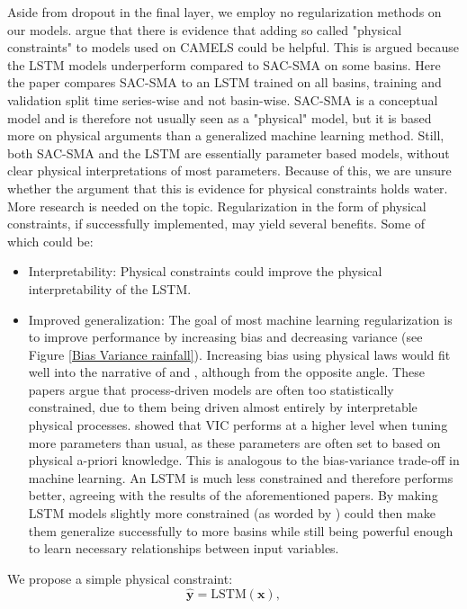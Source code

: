 Aside from dropout in the final layer, we employ no regularization methods on 
our models. \citet{lstm_third_paper} 
argue that there is evidence that adding so called "physical constraints" to 
models used on CAMELS could be helpful. This is argued because the LSTM models 
underperform compared to SAC-SMA on some basins. Here the paper compares SAC-SMA 
to an LSTM trained on all basins, training and validation split time series-wise 
and not basin-wise. SAC-SMA is a conceptual model and is therefore not usually seen 
as a "physical" model, but it is based more on physical arguments than a 
generalized machine learning method. Still, both SAC-SMA and the LSTM are essentially 
parameter based models, without clear physical interpretations of most parameters. 
Because of this, we are unsure whether the argument that this is evidence for physical 
constraints holds water. More research is needed on the topic. Regularization in 
the form of physical constraints, if successfully implemented, may yield several 
benefits. Some of which could be:
\begin{itemize}
\item Interpretability: Physical constraints could improve the physical interpretability 
of the LSTM.
\item Improved generalization: The goal of most machine learning regularization is 
to improve performance by increasing bias and decreasing variance (see Figure 
\ref{Bias Variance rainfall}). Increasing bias using physical laws would fit well 
into the narrative of \citet{BiasVarianceVIC} and \citet{VICbench}, although from 
the opposite angle. These papers argue that process-driven models are often too 
statistically constrained, due to them being driven almost entirely by interpretable 
physical processes. \citet{VICbench} showed that VIC performs at a higher level 
when tuning more parameters than usual, as these parameters are often set to based 
on physical a-priori knowledge. This is analogous to the bias-variance trade-off 
in machine learning. An LSTM is much less constrained and therefore performs better, 
agreeing with the results of the aforementioned papers. By making LSTM models 
slightly more constrained (as worded by \citet{BiasVarianceVIC}) could then make 
them generalize successfully to more basins while still being powerful enough to 
learn necessary relationships between input variables.
\end{itemize}
We propose a simple physical constraint:
\begin{equation}
\bm{\hat{y}} = \text{LSTM}(\bm{x}),
\end{equation}
